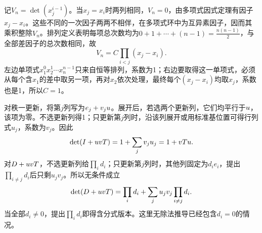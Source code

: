 \label{der:1-3}
记$V_n=\det(x_j^{i-1})$。当$x_j=x_i$时两列相同，$V_n=0$，由多项式因式定理有因子$x_j-x_i$。这些不同的一次因子两两不相伴，在多项式环中为互异素因子，因而其乘积整除$V_n$。排列定义表明每项总次数均为$0+1+\cdots+(n-1)=\frac{n(n-1)}{2}$，与全部差因子的总次数相同，故
\[V_n=C\prod_{i<j}(x_j-x_i).\]
左边单项式$x_1^0x_2^1\cdots x_n^{n-1}$只来自恒等排列，系数为1；右边要取得这一单项式，必须从每个含$x_1$的差中取另一项，再对$x_2$依次处理，最终每个$(x_j-x_i)$均取$x_j$，系数也是1，所以$C=1$。

对秩一更新，将第$j$列写为$e_j+v_ju$。展开后，若选两个更新列，它们均平行于$u$，该项为零。不选更新列得1；只更新第$j$列时，沿该列展开或用标准基位置可得行列式$u_j$，系数为$v_j$。因此
\[\det(I+uvT)=1+\sum_jv_ju_j=1+vTu.\]
对$D+uvT$，不选更新列给$\prod_i d_i$；只更新第$j$列时，其他列固定为$d_ie_i$，提出$\prod_{i\ne j}d_i$后只剩$u_jv_j$。所以无条件成立
\[\det(D+uvT)=\prod_i d_i+\sum_j u_jv_j\prod_{i\ne j}d_i.\]
当全部$d_i\ne0$，提出$\prod_i d_i$即得含分式版本。这里无除法推导已经包含$d_i=0$的情况。
